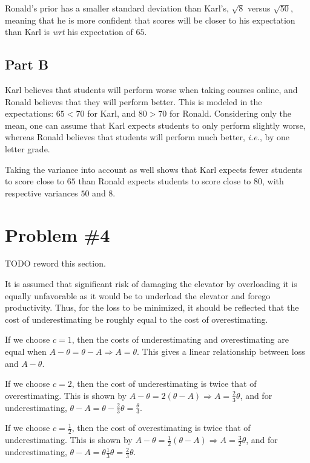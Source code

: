 \documentclass{article}
\begin{document}
Ronald's prior has a smaller standard deviation than Karl's, $\sqrt{8}$ versus $\sqrt{50}$, meaning that he is more confident that scores will be closer to his expectation than Karl is \textit{wrt} his expectation of $65$.

\subsection*{Part B}

Karl believes that students will perform worse when taking courses online, and Ronald believes that they will perform better.
This is modeled in the expectations: $65 < 70$ for Karl, and $80 > 70$ for Ronald.
Considering only the mean, one can assume that Karl expects students to only perform slightly worse, whereas Ronald believes that students will perform much better, \textit{i.e.}, by one letter grade.

Taking the variance into account as well shows that Karl expects fewer students to score close to $65$ than Ronald expects students to score close to $80$, with respective variances $50$ and $8$.

\section*{Problem \#4}

TODO reword this section.

It is assumed that significant risk of damaging the elevator by overloading it is equally unfavorable as it would be to underload the elevator and forego productivity.
Thus, for the loss to be minimized, it should be reflected that the cost of underestimating be roughly equal to the cost of overestimating.

If we choose $c = 1$, then the costs of underestimating and overestimating are equal when $A - \theta = \theta - A \Longrightarrow A = \theta$.
This gives a linear relationship between loss and $A - \theta$.

If we choose $c = 2$, then the cost of underestimating is twice that of overestimating.
This is shown by $A - \theta = 2(\theta - A) \Longrightarrow A = \frac{2}{3}\theta$, and for underestimating, $\theta - A = \theta - \frac{2}{3}\theta = \frac{\theta}{3}$.

If we choose $c = \frac{1}{2}$, then the cost of overestimating is twice that of underestimating.
This is shown by $A - \theta = \frac{1}{2}(\theta - A) \Longrightarrow A = \frac{3}{2}\theta$, and for underestimating, $\theta - A = \theta \frac{1}{3}\theta = \frac{2}{3}\theta$.
\end{document}
